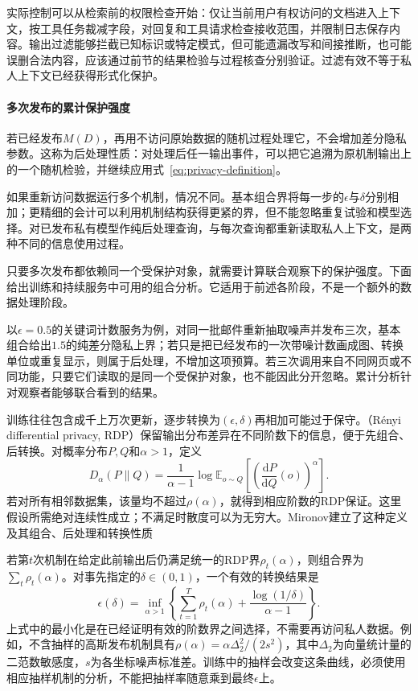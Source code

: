 实际控制可以从检索前的权限检查开始：仅让当前用户有权访问的文档进入上下文，按工具任务裁减字段，对回复和工具请求检查接收范围，并限制日志保存内容。输出过滤能够拦截已知标识或特定模式，但可能遗漏改写和间接推断，也可能误删合法内容，应该通过前节的结果检验与过程核查分别验证。过滤有效不等于私人上下文已经获得形式化保护。

\paragraph{多次发布的累计保护强度}

若已经发布$M(D)$，再用不访问原始数据的随机过程处理它，不会增加差分隐私参数。这称为后处理性质：对处理后任一输出事件，可以把它追溯为原机制输出上的一个随机检验，并继续应用式~\eqref{eq:privacy-definition}。

如果重新访问数据运行多个机制，情况不同。基本组合界将每一步的$\epsilon$与$\delta$分别相加；更精细的会计可以利用机制结构获得更紧的界，但不能忽略重复试验和模型选择。对已发布私有模型作纯后处理查询，与每次查询都重新读取私人上下文，是两种不同的信息使用过程。

只要多次发布都依赖同一个受保护对象，就需要计算联合观察下的保护强度。下面给出训练和持续服务中可用的组合分析。它适用于前述各阶段，不是一个额外的数据处理阶段。

以$\epsilon=0.5$的关键词计数服务为例，对同一批邮件重新抽取噪声并发布三次，基本组合给出$1.5$的纯差分隐私上界；若只是把已经发布的一次带噪计数画成图、转换单位或重复显示，则属于后处理，不增加这项预算。若三次调用来自不同网页或不同功能，只要它们读取的是同一个受保护对象，也不能因此分开忽略。累计分析针对观察者能够联合看到的结果。

训练往往包含成千上万次更新，逐步转换为$(\epsilon,\delta)$再相加可能过于保守。（Rényi differential privacy, RDP）保留输出分布差异在不同阶数下的信息，便于先组合、后转换。对概率分布$P,Q$和$\alpha>1$，定义
\begin{equation}
 D_\alpha(P\|Q)=\frac{1}{\alpha-1}
 \log\mathbb E_{o\sim Q}
 \left[\left(\frac{\mathrm dP}{\mathrm dQ}(o)\right)^\alpha\right].
 \label{eq:privacy-renyi}
\end{equation}
若对所有相邻数据集，该量均不超过$\rho(\alpha)$，就得到相应阶数的RDP保证。这里假设所需绝对连续性成立；不满足时散度可以为无穷大。Mironov建立了这种定义及其组合、后处理和转换性质

若第$t$次机制在给定此前输出后仍满足统一的RDP界$\rho_t(\alpha)$，则组合界为$\sum_t\rho_t(\alpha)$。对事先指定的$\delta\in(0,1)$，一个有效的转换结果是
\begin{equation}
 \epsilon(\delta)=
 \inf_{\alpha>1}\left\{
 \sum_{t=1}^{T}\rho_t(\alpha)
 +\frac{\log(1/\delta)}{\alpha-1}
 \right\}.
 \label{eq:privacy-accounting}
\end{equation}
上式中的最小化是在已经证明有效的阶数界之间选择，不需要再访问私人数据。例如，不含抽样的高斯发布机制具有$\rho(\alpha)=\alpha\Delta_2^2/(2s^2)$，其中$\Delta_2$为向量统计量的二范数敏感度，$s$为各坐标噪声标准差。训练中的抽样会改变这条曲线，必须使用相应抽样机制的分析，不能把抽样率随意乘到最终$\epsilon$上。

